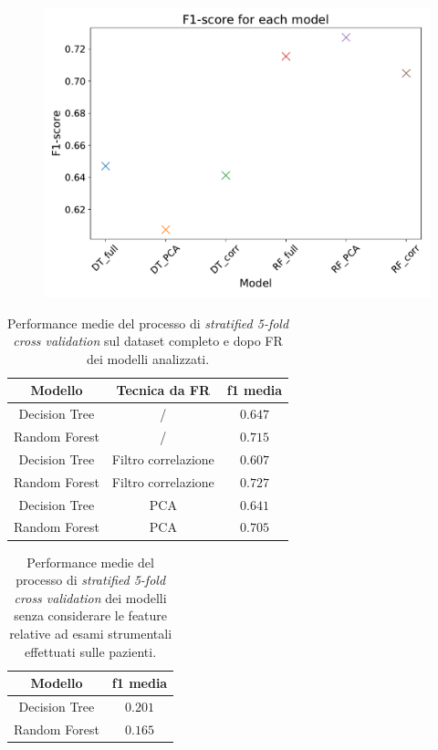 \begin{figure}
	\centering
	\includegraphics[width=0.8\linewidth]{images/fscore}
	\caption{}
	\label{fig:fscore}
\end{figure}

\begin{table}
\centering
\caption{Performance medie del processo di \textit{stratified 5-fold cross validation} sul dataset completo e dopo FR dei modelli analizzati.}
\label{tab:f1score}
\begin{tabular}{|c|c|c|}
	\toprule
	Modello & Tecnica da FR & f1 media \\ 
	\midrule 
	Decision Tree & / & $0.647$ \\  
	Random Forest & / & $0.715$ \\ 
	Decision Tree & Filtro correlazione & $0.607$ \\ 
	Random Forest & Filtro correlazione & $0.727$ \\ 
	Decision Tree & PCA & $0.641$ \\ 
	Random Forest & PCA & $0.705$ \\ 
	\bottomrule
\end{tabular}
\end{table}

\begin{table}
	\centering
	\caption{Performance medie del processo di \textit{stratified 5-fold cross validation} dei modelli senza considerare le feature relative ad esami strumentali effettuati sulle pazienti.}
	\label{tab:noexamsscore}
	\begin{tabular}{|c|c|}
		\toprule
		Modello & f1 media \\ 
		\midrule 
		Decision Tree & $0.201$ \\  
		Random Forest  & $0.165$ \\ 
		\bottomrule
	\end{tabular}
\end{table}

